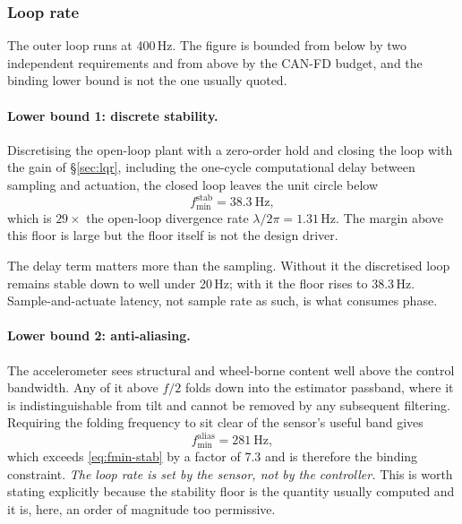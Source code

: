 \subsubsection{Loop rate}
\label{sec:loop-rate}

The outer loop runs at 400\,Hz. The figure is bounded from below by two
independent requirements and from above by the CAN-FD budget, and the
binding lower bound is not the one usually quoted.

\paragraph{Lower bound 1: discrete stability.} Discretising the open-loop
plant with a zero-order hold and closing the loop with the gain of
\S\ref{sec:lqr}, including the one-cycle computational delay between
sampling and actuation, the closed loop leaves the unit circle below
%
\begin{equation}
  f_{\min}^{\mathrm{stab}} = 38.3\ \mathrm{Hz},
  \label{eq:fmin-stab}
\end{equation}
%
which is $29\times$ the open-loop divergence rate
$\lambda/2\pi = 1.31$\,Hz. The margin above this floor is large but the floor
itself is not the design driver.

The delay term matters more than the sampling. Without it the discretised
loop remains stable down to well under 20\,Hz; with it the floor rises to
38.3\,Hz. Sample-and-actuate latency, not sample rate as such, is what
consumes phase.

\paragraph{Lower bound 2: anti-aliasing.} The accelerometer sees structural
and wheel-borne content well above the control bandwidth. Any of it above
$f/2$ folds down into the estimator passband, where it is
indistinguishable from tilt and cannot be removed by any subsequent
filtering. Requiring the folding frequency to sit clear of the sensor's
useful band gives
%
\begin{equation}
  f_{\min}^{\mathrm{alias}} = 281\ \mathrm{Hz},
  \label{eq:fmin-alias}
\end{equation}
%
which exceeds \eqref{eq:fmin-stab} by a factor of $7.3$ and is therefore the
binding constraint. \emph{The loop rate is set by the sensor, not by the
controller.} This is worth stating explicitly because the stability floor is
the quantity usually computed and it is, here, an order of magnitude too
permissive.


